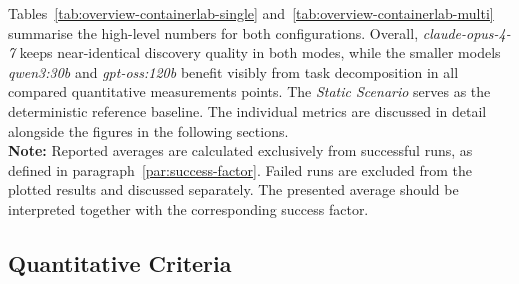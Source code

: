 \begin{table}[H]
    \caption{Benchmark Results --- Containerlab, Multi-Agent ($n = 10$ runs each)}
    \centering
    \label{tab:overview-containerlab-multi}
\end{table}

Tables~\ref{tab:overview-containerlab-single} and~\ref{tab:overview-containerlab-multi} summarise
the high-level numbers for both configurations.
Overall, \textit{claude-opus-4-7} keeps near-identical discovery quality in both modes, while the
smaller models \textit{qwen3:30b} and \textit{gpt-oss:120b} benefit visibly from task decomposition in all compared
quantitative measurements points.
The \emph{Static Scenario} serves as the deterministic reference baseline.
The individual metrics are discussed in detail alongside the figures in the following sections. \\
\textbf{Note:} Reported averages are calculated exclusively from successful runs, as defined in paragraph~\ref{par:success-factor}.
Failed runs are excluded from the plotted results and discussed separately.
The presented average should be interpreted together with the corresponding success factor.

\subsection{Quantitative Criteria}\label{subsec:quantitative-criteria-containerlab}

